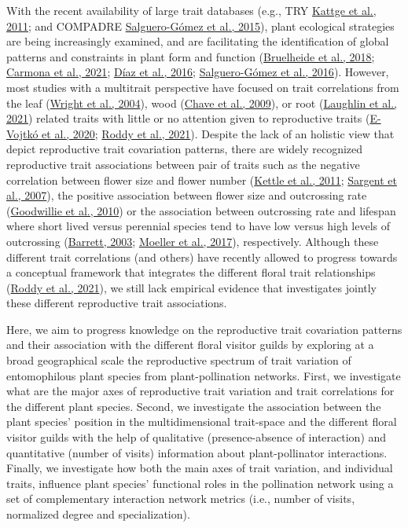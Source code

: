 \documentclass[
  12pt,
  a4paper,
]{article}
\begin{document}
With the recent availability of large trait databases (e.g., TRY \protect\hyperlink{ref-kattge2011}{Kattge et al., 2011}; and COMPADRE \protect\hyperlink{ref-salguero2015}{Salguero-Gómez et al., 2015}), plant ecological strategies are being increasingly examined, and are facilitating the identification of global patterns and constraints in plant form and function (\protect\hyperlink{ref-bruelheide2018}{Bruelheide et al., 2018}; \protect\hyperlink{ref-carmona2021}{Carmona et al., 2021}; \protect\hyperlink{ref-diaz2016}{Díaz et al., 2016}; \protect\hyperlink{ref-salguero2016}{Salguero-Gómez et al., 2016}). However, most studies with a multitrait perspective have focused on trait correlations from the leaf (\protect\hyperlink{ref-wright2004}{Wright et al., 2004}), wood (\protect\hyperlink{ref-chave2009}{Chave et al., 2009}), or root (\protect\hyperlink{ref-laughlin2021}{Laughlin et al., 2021}) related traits with little or no attention given to reproductive traits (\protect\hyperlink{ref-evojtko2020}{E-Vojtkó et al., 2020}; \protect\hyperlink{ref-roddy2021}{Roddy et al., 2021}). Despite the lack of an holistic view that depict reproductive trait covariation patterns, there are widely recognized reproductive trait associations between pair of traits such as the negative correlation between flower size and flower number (\protect\hyperlink{ref-kettle2011}{Kettle et al., 2011}; \protect\hyperlink{ref-sargent2007}{Sargent et al., 2007}), the positive association between flower size and outcrossing rate (\protect\hyperlink{ref-goodwillie2010}{Goodwillie et al., 2010}) or the association between outcrossing rate and lifespan where short lived versus perennial species tend to have low versus high levels of outcrossing (\protect\hyperlink{ref-barrett2003}{Barrett, 2003}; \protect\hyperlink{ref-moeller2017}{Moeller et al., 2017}), respectively. Although these different trait correlations (and others) have recently allowed to progress towards a conceptual framework that integrates the different floral trait relationships (\protect\hyperlink{ref-roddy2021}{Roddy et al., 2021}), we still lack empirical evidence that investigates jointly these different reproductive trait associations.

Here, we aim to progress knowledge on the reproductive trait covariation patterns and their association with the different floral visitor guilds by exploring at a broad geographical scale the reproductive spectrum of trait variation of entomophilous plant species from plant-pollination networks. First, we investigate what are the major axes of reproductive trait variation and trait correlations for the different plant species. Second, we investigate the association between the plant species' position in the multidimensional trait-space and the different floral visitor guilds with the help of qualitative (presence-absence of interaction) and quantitative (number of visits) information about plant-pollinator interactions. Finally, we investigate how both the main axes of trait variation, and individual traits, influence plant species' functional roles in the pollination network using a set of complementary interaction network metrics (i.e., number of visits, normalized degree and specialization).
\end{document}
